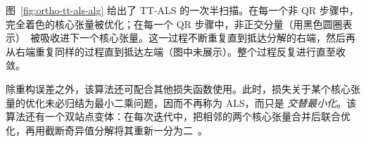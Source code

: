 图~\ref{fig:ortho-tt-als-alg} 给出了 TT-ALS 的一次半扫描。在每一个非 QR 步骤中，完全着色的核心张量被优化；在每一个 QR 步骤中，非正交分量（用黑色圆圈表示）~被吸收进下一个核心张量。这一过程不断重复直到抵达分解的右端，然后再从右端重复同样的过程直到抵达左端（图中未展示）。整个过程反复进行直至收敛。 
\begin{remark}
    除重构误差之外，该算法还可配合其他损失函数使用。此时，损失关于某个核心张量的优化未必归结为最小二乘问题，因而不再称为 ALS，而只是 \emph{交替最小化}。该算法还有一个双站点变体：在每次迭代中，把相邻的两个核心张量合并后联合优化，再用截断奇异值分解将其重新一分为二~\citep{holtz2012alternating}。
\end{remark}

